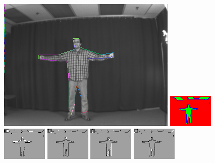 \begin{figure}

\includegraphics[width=0.48 \linewidth]{output/2.detection/local_inference/out.s1.0030.d/thefinalparse.png}
\includegraphics[width=0.48 \linewidth]{output/2.detection/local_inference/out.s1.0030.d/local.x5.interior.png}
\includegraphics[width=0.24 \linewidth]{output/2.detection/local_inference/out.s1.0030.d/local.x5.orientations.0.png}
\includegraphics[width=0.24 \linewidth]{output/2.detection/local_inference/out.s1.0030.d/local.x5.orientations.1.png}
\includegraphics[width=0.24 \linewidth]{output/2.detection/local_inference/out.s1.0030.d/local.x5.orientations.2.png}
\includegraphics[width=0.24 \linewidth]{output/2.detection/local_inference/out.s1.0030.d/local.x5.orientations.3.png}


\end{figure}
